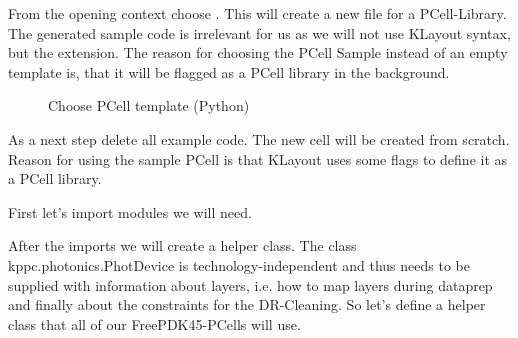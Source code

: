 \documentclass[a4paper,10pt,english]{sphinxmanual}
\begin{document}
From the opening context choose . This will create a new  file for a PCell-Library.
The generated sample code is irrelevant for us as we will not use KLayout syntax, but the extension.
The reason for choosing the PCell Sample instead of an empty template is, that it will be flagged as a PCell library in
the background.

\begin{figure}[htbp]
\centering
\capstart

\noindent{}
\caption{Choose PCell template (Python)}\label{\detokenize{photonics/example_library:id3}}\end{figure}

As a next step delete all example code. The new cell will be created from scratch. Reason for using the sample PCell is that KLayout
uses some flags to define it as a PCell library.

First let’s import modules we will need.

\begin{sphinxVerbatim}[commandchars=\\\{\},numbers=left,firstnumber=1,stepnumber=1]
 
 
    
   
   
 
\end{sphinxVerbatim}

After the imports we will create a helper class. The class kppc.photonics.PhotDevice is technology-independent and
thus needs to be supplied with information about layers, i.e. how to map layers during dataprep and finally about
the constraints for the DR-Cleaning. So let’s define a helper class that all of our FreePDK45-PCells will use.
\end{document}
